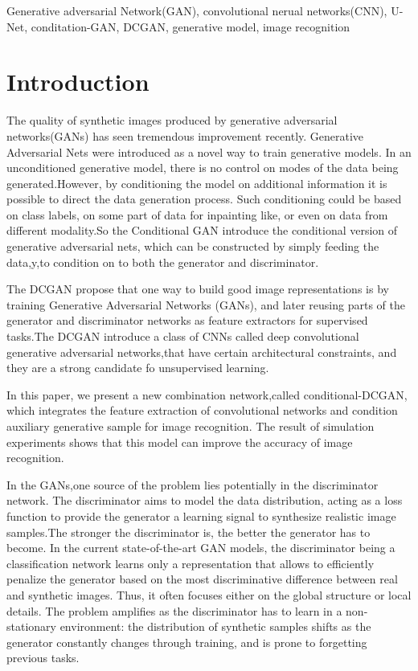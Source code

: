 \documentclass[conference, a4paper]{IEEEtran}
\begin{document}

\begin{IEEEkeywords}
	Generative adversarial Network(GAN), convolutional nerual networks(CNN), U-Net, conditation-GAN, DCGAN, generative model, image recognition
\end{IEEEkeywords}
 
\section{Introduction}
The quality of synthetic images produced by generative adversarial networks(GANs) has seen tremendous improvement recently.
Generative Adversarial Nets were introduced as a novel way to train generative models.
In an unconditioned generative model, there is no control on modes of the data being generated.However, by conditioning the model on additional information it is possible to direct the data generation process. Such conditioning could be based on class labels, on some part of data for inpainting like, or even on data from different modality.So the Conditional GAN introduce the conditional version of generative adversarial nets, which can be constructed by simply feeding the data,y,to condition on to both the generator and discriminator.

The DCGAN propose that one way to build
good image representations is by training Generative Adversarial Networks (GANs), and later reusing parts of the generator and discriminator networks as feature extractors for supervised tasks.The DCGAN introduce a class of CNNs called deep convolutional generative adversarial networks,that have certain architectural constraints, and they are a strong candidate fo unsupervised learning.

In this paper, we present a new combination network,called conditional-DCGAN, which integrates the feature extraction of convolutional networks and condition auxiliary generative sample for image recognition. The result of simulation experiments shows that this model can improve the accuracy of image recognition.

In the GANs,one source of the problem lies potentially in the discriminator network. The discriminator aims to model the data distribution, acting as a loss function to provide the generator a learning signal to synthesize realistic image samples.The stronger the discriminator is, the better the generator has to become. In the current state-of-the-art GAN models, the discriminator being a classification network learns only a representation that allows to efficiently penalize the generator based on the most discriminative difference between real and synthetic images. Thus, it often focuses either on the global structure or local details. The problem amplifies as the discriminator has to learn in a non-stationary environment: the distribution of synthetic samples shifts as the generator constantly changes through training, and is prone to forgetting previous tasks.
\end{document}
